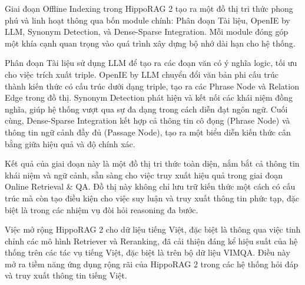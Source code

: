 Giai đoạn Offline Indexing trong HippoRAG 2 tạo ra một đồ thị tri thức phong phú và linh hoạt thông qua bốn module chính: Phân đoạn Tài liệu, OpenIE by LLM, Synonym Detection, và Dense-Sparse Integration. Mỗi module đóng góp một khía cạnh quan trọng vào quá trình xây dựng bộ nhớ dài hạn cho hệ thống.

Phân đoạn Tài liệu sử dụng LLM để tạo ra các đoạn văn có ý nghĩa logic, tối ưu cho việc trích xuất triple. OpenIE by LLM chuyển đổi văn bản phi cấu trúc thành kiến thức có cấu trúc dưới dạng triple, tạo ra các Phrase Node và Relation Edge trong đồ thị. Synonym Detection phát hiện và kết nối các khái niệm đồng nghĩa, giúp hệ thống vượt qua sự đa dạng trong cách diễn đạt ngôn ngữ. Cuối cùng, Dense-Sparse Integration kết hợp cả thông tin cô đọng (Phrase Node) và thông tin ngữ cảnh đầy đủ (Passage Node), tạo ra một biểu diễn kiến thức cân bằng giữa hiệu quả và độ chính xác.

Kết quả của giai đoạn này là một đồ thị tri thức toàn diện, nắm bắt cả thông tin khái niệm và ngữ cảnh, sẵn sàng cho việc truy xuất hiệu quả trong giai đoạn Online Retrieval & QA. Đồ thị này không chỉ lưu trữ kiến thức một cách có cấu trúc mà còn tạo điều kiện cho việc suy luận và truy xuất thông tin phức tạp, đặc biệt là trong các nhiệm vụ đòi hỏi reasoning đa bước.

Việc mở rộng HippoRAG 2 cho dữ liệu tiếng Việt, đặc biệt là thông qua việc tinh chỉnh các mô hình Retriever và Reranking, đã cải thiện đáng kể hiệu suất của hệ thống trên các tác vụ tiếng Việt, đặc biệt là trên bộ dữ liệu VIMQA. Điều này mở ra tiềm năng ứng dụng rộng rãi của HippoRAG 2 trong các hệ thống hỏi đáp và truy xuất thông tin tiếng Việt.
